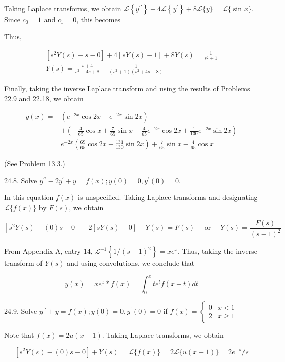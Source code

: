 \documentclass[10pt]{article}
\begin{document}
Taking Laplace transforms, we obtain $\mathscr{L}\left\{y^{\prime \prime}\right\}+4 \mathscr{L}\left\{y^{\prime}\right\}+8 \mathscr{L}\{y\}=\mathscr{L}\{\sin x\}$. Since $c_{0}=1$ and $c_{1}=0$, this becomes

Thus,

$$
\begin{gathered}
{\left[s^{2} Y(s)-s-0\right]+4[s Y(s)-1]+8 Y(s)=\frac{1}{s^{2}+1}} \\
Y(s)=\frac{s+4}{s^{2}+4 s+8}+\frac{1}{\left(s^{2}+1\right)\left(s^{2}+4 s+8\right)}
\end{gathered}
$$

Finally, taking the inverse Laplace transform and using the results of Problems 22.9 and 22.18, we obtain

$$
\begin{aligned}
y(x)= & \left(e^{-2 x} \cos 2 x+e^{-2 x} \sin 2 x\right) \\
& +\left(-\frac{4}{65} \cos x+\frac{7}{65} \sin x+\frac{4}{65} e^{-2 x} \cos 2 x+\frac{1}{130} e^{-2 x} \sin 2 x\right) \\
= & e^{-2 x}\left(\frac{69}{65} \cos 2 x+\frac{131}{130} \sin 2 x\right)+\frac{7}{65} \sin x-\frac{4}{65} \cos x
\end{aligned}
$$

(See Problem 13.3.)

24.8. Solve $y^{\prime \prime}-2 y^{\prime}+y=f(x) ; y(0)=0, y^{\prime}(0)=0$.

In this equation $f(x)$ is unspecified. Taking Laplace transforms and designating $\mathscr{L}\{f(x)\}$ by $F(s)$, we obtain

$$
\left[s^{2} Y(s)-(0) s-0\right]-2[s Y(s)-0]+Y(s)=F(s) \quad \text { or } \quad Y(s)=\frac{F(s)}{(s-1)^{2}}
$$

From Appendix A, entry 14, $\mathscr{L}^{-1}\left\{1 /(s-1)^{2}\right\}=x e^{x}$. Thus, taking the inverse transform of $Y(s)$ and using convolutions, we conclude that

$$
y(x)=x e^{x} * f(x)=\int_{0}^{x} t e^{t} f(x-t) d t
$$

24.9. Solve $y^{\prime \prime}+y=f(x) ; y(0)=0, y^{\prime}(0)=0$ if $f(x)= \begin{cases}0 & x<1 \\ 2 & x \geq 1\end{cases}$

Note that $f(x)=2 u(x-1)$. Taking Laplace transforms, we obtain

$$
\left[s^{2} Y(s)-(0) s-0\right]+Y(s)=\mathscr{L}\{f(x)\}=2 \mathscr{L}\{u(x-1)\}=2 e^{-s} / s
$$
\end{document}

